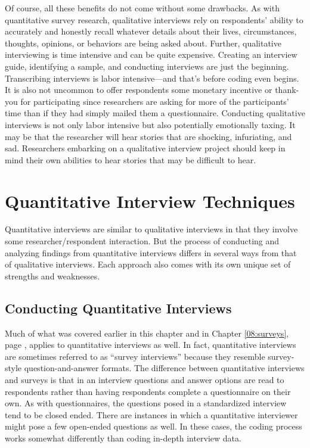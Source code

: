 Of course, all these benefits do not come without some drawbacks. As with quantitative survey research, qualitative interviews rely on respondents' ability to accurately and honestly recall whatever details about their lives, circumstances, thoughts, opinions, or behaviors are being asked about. Further, qualitative interviewing is time intensive and can be quite expensive. Creating an interview guide, identifying a sample, and conducting interviews are just the beginning. Transcribing interviews is labor intensive---and that's before coding even begins. It is also not uncommon to offer respondents some monetary incentive or thank-you for participating since researchers are asking for more of the participants' time than if they had simply mailed them a questionnaire. Conducting qualitative interviews is not only labor intensive but also potentially emotionally taxing. It may be that the researcher will hear stories that are shocking, infuriating, and sad.  Researchers embarking on a qualitative interview project should keep in mind their own abilities to hear stories that may be difficult to hear.

\section{Quantitative Interview Techniques}

Quantitative interviews are similar to qualitative interviews in that they involve some researcher/respondent interaction. But the process of conducting and analyzing findings from quantitative interviews differs in several ways from that of qualitative interviews. Each approach also comes with its own unique set of strengths and weaknesses.

\subsection{Conducting Quantitative Interviews}

Much of what was covered earlier in this chapter and in Chapter \ref{08:surveys}, page \pageref{08:surveys}, applies to quantitative interviews as well. In fact, quantitative interviews are sometimes referred to as ``survey interviews'' because they resemble survey-style question-and-answer formats. The difference between quantitative interviews and surveys is that in an interview questions and answer options are read to respondents rather than having respondents complete a questionnaire on their own. As with questionnaires, the questions posed in a standardized interview tend to be closed ended. There are instances in which a quantitative interviewer might pose a few open-ended questions as well. In these cases, the coding process works somewhat differently than coding in-depth interview data.

